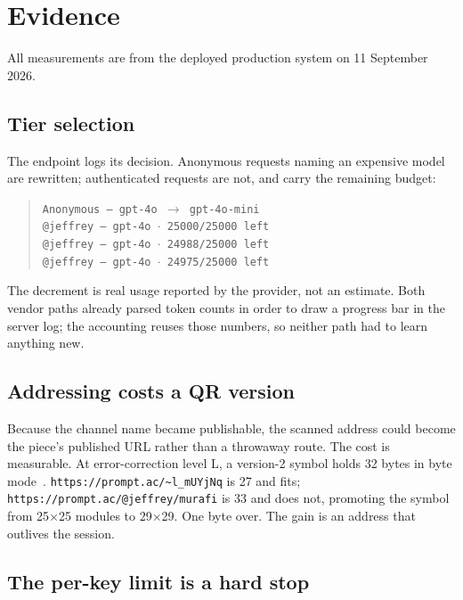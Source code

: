 \documentclass[10pt,letterpaper,twocolumn]{article}
\newcommand{\code}[1]{\texttt{#1}}
\begin{document}
\section{Evidence}
\label{sec:evidence}

All measurements are from the deployed production system on 11 September 2026.

\subsection{Tier selection}

The endpoint logs its decision. Anonymous requests naming an expensive model are
rewritten; authenticated requests are not, and carry the remaining budget:

\begin{quote}
\small\code{Anonymous --- gpt-4o $\rightarrow$ gpt-4o-mini}\\
\small\code{@jeffrey --- gpt-4o $\cdot$ 25000/25000 left}\\
\small\code{@jeffrey --- gpt-4o $\cdot$ 24988/25000 left}\\
\small\code{@jeffrey --- gpt-4o $\cdot$ 24975/25000 left}
\end{quote}

\noindent The decrement is real usage reported by the provider, not an estimate.
Both vendor paths already parsed token counts in order to draw a progress bar in
the server log; the accounting reuses those numbers, so neither path had to learn
anything new.

\subsection{Addressing costs a QR version}

Because the channel name became publishable, the scanned address could become
the piece's published URL rather than a throwaway route. The cost is measurable.
At error-correction level L, a version-2 symbol holds 32 bytes in byte
mode~\citep{qrspec}.
\code{https://prompt.ac/\textasciitilde l\_mUYjNq} is 27 and fits;
\code{https://prompt.ac/@jeffrey/murafi} is 33 and does not, promoting the symbol
from 25$\times$25 modules to 29$\times$29. One byte over. The gain is an address
that outlives the session.

\subsection{The per-key limit is a hard stop}
\end{document}
